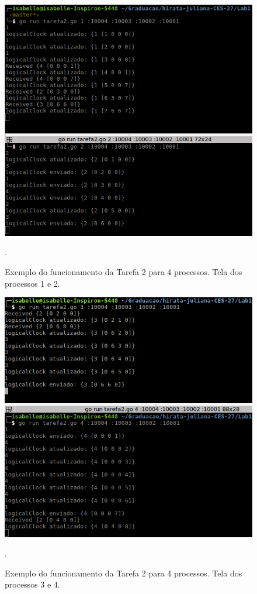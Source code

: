 \documentclass[conference]{IEEEtran}
\begin{document}
\begin{figure}[H]
\centering
\centerline{\includegraphics[scale=0.4]{imagens/tarefa2-testecriado-1.png}}
\caption{Exemplo do funcionamento da Tarefa 2 para 4 processos. Tela dos processos 1 e 2.}.
\label{tarefa1-testecriado-1}
\end{figure}

\begin{figure}[H]
\centering
\centerline{\includegraphics[scale=0.4]{imagens/tarefa2-testecriado-2.png}}
\caption{Exemplo do funcionamento da Tarefa 2 para 4 processos. Tela dos processos 3 e 4.}.
\label{tarefa1-testecriado-2}
\end{figure}
\end{document}
